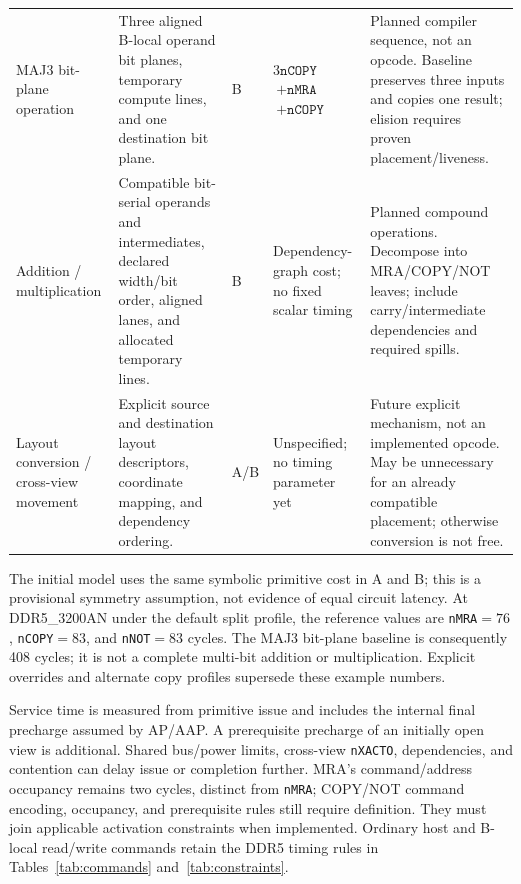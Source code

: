 \documentclass[9pt,twocolumn]{extarticle}
\newcommand{\param}[1]{\texttt{#1}}
\begin{document}
\begin{table}[t]
\begin{tabularx}{\textwidth}{@{}p{}p{}p{}p{}X@{}}
MAJ3 bit-plane operation & Three aligned B-local operand bit planes, temporary compute lines, and one destination bit plane. & B & $3\param{nCOPY}$\newline${}+\param{nMRA}$\newline${}+\param{nCOPY}$ & Planned compiler sequence, not an opcode. Baseline preserves three inputs and copies one result; elision requires proven placement/liveness. \\
Addition / multiplication & Compatible bit-serial operands and intermediates, declared width/bit order, aligned lanes, and allocated temporary lines. & B & Dependency-graph cost; no fixed scalar timing & Planned compound operations. Decompose into MRA/COPY/NOT leaves; include carry/intermediate dependencies and required spills. \\
Layout conversion / cross-view movement & Explicit source and destination layout descriptors, coordinate mapping, and dependency ordering. & A/B & Unspecified; no timing parameter yet & Future explicit mechanism, not an implemented opcode. May be unnecessary for an already compatible placement; otherwise conversion is not free. \\
\bottomrule
\end{tabularx}
\end{table}

The initial model uses the same symbolic primitive cost in A and B; this is
a provisional symmetry assumption, not evidence of equal circuit latency.
At DDR5\_3200AN under the default split profile, the reference values are
\param{nMRA}$=76$, \param{nCOPY}$=83$, and \param{nNOT}$=83$ cycles.
The MAJ3 bit-plane baseline is consequently 408 cycles; it is not a complete
multi-bit addition or multiplication. Explicit overrides and alternate copy
profiles supersede these example numbers.

Service time is measured from primitive issue and includes the internal final
precharge assumed by AP/AAP. A prerequisite precharge of an initially open
view is additional. Shared bus/power limits, cross-view \param{nXACTO},
dependencies, and contention can delay issue or completion further. MRA's
command/address occupancy remains two cycles, distinct from \param{nMRA};
COPY/NOT command encoding, occupancy, and prerequisite rules still require
definition. They must join applicable activation constraints when implemented.
Ordinary host and B-local read/write commands retain the DDR5 timing rules in
Tables~\ref{tab:commands} and~\ref{tab:constraints}.
\end{document}
